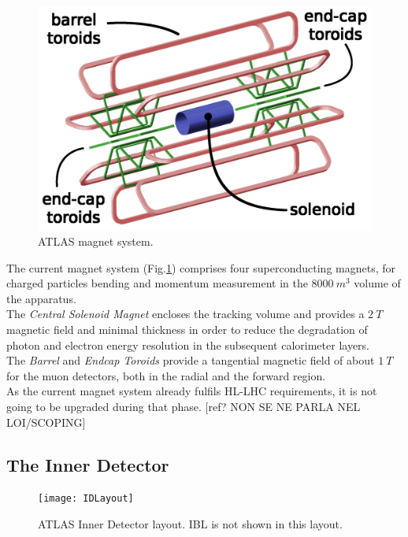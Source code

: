 \documentclass[a4paper,twoside,12pt]{article}
\begin{document}
\begin{figure} [h]
	\includegraphics[width=\textwidth]{magnetSystems}
	\caption{ATLAS magnet system\cite{magnet_system_picture}.}
	\label{fig:magnet_system_picture}
\end{figure}

The current magnet system (Fig.\ref{fig:magnet_system_picture}) comprises four superconducting magnets\cite{magnet_system}, for charged particles bending and momentum measurement in the $8000\ m^3$ volume of the apparatus.\\

The \textit{Central Solenoid Magnet} encloses the tracking volume and provides a $2\ T$ magnetic field and minimal thickness in order to reduce the degradation of photon and electron energy resolution in the subsequent calorimeter layers.\\

The \textit{Barrel} and \textit{Endcap Toroids} provide a tangential magnetic field of about $1\ T$ for the muon detectors, both in the radial and the forward region.\\

As the current magnet system already fulfils HL-LHC requirements, it is not going to be
upgraded during that phase. [ref? NON SE NE PARLA NEL LOI/SCOPING]

\subsection{The Inner Detector}

\begin{figure} [h]
	\texttt{[image: IDLayout]}
	\caption{ATLAS Inner Detector layout\cite{Aad:2008zzm}. IBL is not shown in this layout.}
	\label{fig:IDLayout}
\end{figure}
\end{document}

